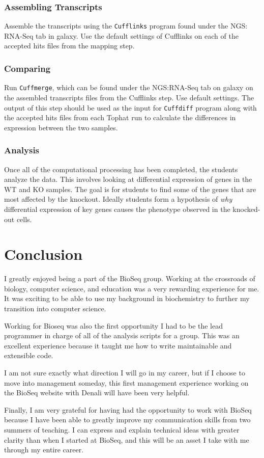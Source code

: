 \documentclass{report}
\begin{document}
\subsection{Assembling Transcripts}
Assemble the transcripts using the \texttt{Cufflinks} program found under the NGS: RNA-Seq tab in galaxy. Use the default settings of Cufflinks on each of the accepted hits files from the mapping step.

\subsection{Comparing}
Run \texttt{Cuffmerge}, which can be found under the NGS:RNA-Seq tab on galaxy on the assembled transcripts files from the Cufflinks step. Use default settings. The output of this step should be used as the input for \texttt{Cuffdiff} program along with the accepted hits files from each Tophat run to calculate the differences in expression between the two samples. 

\subsection{Analysis}
Once all of the computational processing has been completed, the students analyze the data. This involves looking at differential expression of genes in the WT and KO samples. The goal is for students to find some of the genes that are most affected by the knockout. Ideally students form a hypothesis of \emph{why} differential expression of key genes causes the phenotype observed in the knocked-out cells.

\chapter{Conclusion}
I greatly enjoyed being a part of the BioSeq group. Working at the crossroads of biology, computer science, and education was a very rewarding experience for me. It was exciting to be able to use my background in biochemistry to further my transition into computer science.

Working for Bioseq was also the first opportunity I had to be the lead programmer in charge of all of the analysis scripts for a group. This was an excellent experience because it taught me how to write maintainable and extensible code.

I am not sure exactly what direction I will go in my career, but if I  choose to move into management someday, this first management experience working on the BioSeq website with Denali will have been very helpful.

Finally, I am very grateful for having had the opportunity to work with BioSeq because I have been able to greatly improve my communication skills from two summers of teaching. I can express and explain technical ideas with greater clarity than when I started at BioSeq, and this will be an asset I take with me through my entire career. 



\end{document}
